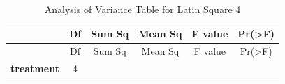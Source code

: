\documentclass[]{article}
\begin{document}
\begin{longtable}[]{@{}cccccc@{}}
\caption{Analysis of Variance Table for Latin Square 4}\tabularnewline
\toprule
\begin{minipage}[b]{0.19\columnwidth}\centering\strut
~\strut
\end{minipage} & \begin{minipage}[b]{0.06\columnwidth}\centering\strut
Df\strut
\end{minipage} & \begin{minipage}[b]{0.10\columnwidth}\centering\strut
Sum Sq\strut
\end{minipage} & \begin{minipage}[b]{0.12\columnwidth}\centering\strut
Mean Sq\strut
\end{minipage} & \begin{minipage}[b]{0.12\columnwidth}\centering\strut
F value\strut
\end{minipage} & \begin{minipage}[b]{0.12\columnwidth}\centering\strut
Pr(\textgreater{}F)\strut
\end{minipage}\tabularnewline
\midrule
\endfirsthead
\toprule
\begin{minipage}[b]{0.19\columnwidth}\centering\strut
~\strut
\end{minipage} & \begin{minipage}[b]{0.06\columnwidth}\centering\strut
Df\strut
\end{minipage} & \begin{minipage}[b]{0.10\columnwidth}\centering\strut
Sum Sq\strut
\end{minipage} & \begin{minipage}[b]{0.12\columnwidth}\centering\strut
Mean Sq\strut
\end{minipage} & \begin{minipage}[b]{0.12\columnwidth}\centering\strut
F value\strut
\end{minipage} & \begin{minipage}[b]{0.12\columnwidth}\centering\strut
Pr(\textgreater{}F)\strut
\end{minipage}\tabularnewline
\midrule
\endhead
\begin{minipage}[t]{0.19\columnwidth}\centering\strut
\textbf{treatment}\strut
\end{minipage} & \begin{minipage}[t]{0.06\columnwidth}\centering\strut
4\strut
\end{minipage} & \begin{minipage}[t]{0.10\columnwidth}\centering\strut

\end{minipage}
\end{longtable}
\end{document}
